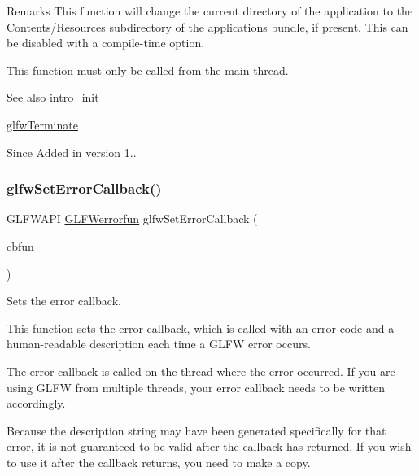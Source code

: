 \begin{DoxyRemark}{Remarks}
This function will change the current directory of the application to the {\ttfamily Contents/\+Resources} subdirectory of the application\textquotesingle{}s bundle, if present. This can be disabled with a compile-\/time option.
\end{DoxyRemark}
This function must only be called from the main thread.

\begin{DoxySeeAlso}{See also}
intro\+\_\+init 

\hyperlink{group__init_gafd90e6fd4819ea9e22e5e739519a6504}{glfw\+Terminate}
\end{DoxySeeAlso}
\begin{DoxySince}{Since}
Added in version 1.. 
\end{DoxySince}
\mbox{\label{group__init_ga5919096b958c47102126061fb5a6f9c3}} 
\subsubsection{\texorpdfstring{glfw\+Set\+Error\+Callback()}{glfwSetErrorCallback()}}
{\footnotesize\ttfamily G\+L\+F\+W\+A\+PI \hyperlink{group__init_ga6b8a2639706d5c409fc1287e8f55e928}{G\+L\+F\+Werrorfun} glfw\+Set\+Error\+Callback (\begin{DoxyParamCaption}\item[{\hyperlink{group__init_ga6b8a2639706d5c409fc1287e8f55e928}{G\+L\+F\+Werrorfun}}]{cbfun }\end{DoxyParamCaption})}



Sets the error callback. 

This function sets the error callback, which is called with an error code and a human-\/readable description each time a G\+L\+FW error occurs.

The error callback is called on the thread where the error occurred. If you are using G\+L\+FW from multiple threads, your error callback needs to be written accordingly.

Because the description string may have been generated specifically for that error, it is not guaranteed to be valid after the callback has returned. If you wish to use it after the callback returns, you need to make a copy.

